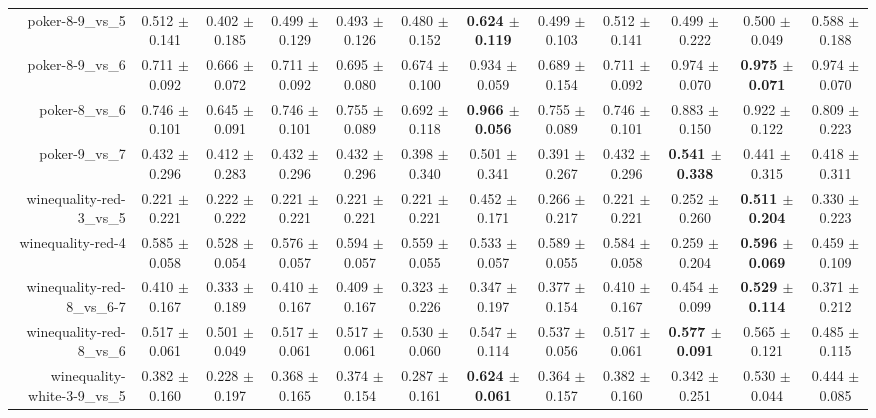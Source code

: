 \begin{table}[!ht]
{\begin{tabular}{r c c c c c c c c c c c}
poker-8-9\_vs\_5 & 0.512 $\pm$ 0.141 & 0.402 $\pm$ 0.185 & 0.499 $\pm$ 0.129 & 0.493 $\pm$ 0.126 & 0.480 $\pm$ 0.152 & \textbf{0.624 $\pm$ 0.119} & 0.499 $\pm$ 0.103 & 0.512 $\pm$ 0.141 & 0.499 $\pm$ 0.222 & 0.500 $\pm$ 0.049 & 0.588 $\pm$ 0.188 \\
poker-8-9\_vs\_6 & 0.711 $\pm$ 0.092 & 0.666 $\pm$ 0.072 & 0.711 $\pm$ 0.092 & 0.695 $\pm$ 0.080 & 0.674 $\pm$ 0.100 & 0.934 $\pm$ 0.059 & 0.689 $\pm$ 0.154 & 0.711 $\pm$ 0.092 & 0.974 $\pm$ 0.070 & \textbf{0.975 $\pm$ 0.071} & 0.974 $\pm$ 0.070 \\
poker-8\_vs\_6 & 0.746 $\pm$ 0.101 & 0.645 $\pm$ 0.091 & 0.746 $\pm$ 0.101 & 0.755 $\pm$ 0.089 & 0.692 $\pm$ 0.118 & \textbf{0.966 $\pm$ 0.056} & 0.755 $\pm$ 0.089 & 0.746 $\pm$ 0.101 & 0.883 $\pm$ 0.150 & 0.922 $\pm$ 0.122 & 0.809 $\pm$ 0.223 \\
poker-9\_vs\_7 & 0.432 $\pm$ 0.296 & 0.412 $\pm$ 0.283 & 0.432 $\pm$ 0.296 & 0.432 $\pm$ 0.296 & 0.398 $\pm$ 0.340 & 0.501 $\pm$ 0.341 & 0.391 $\pm$ 0.267 & 0.432 $\pm$ 0.296 & \textbf{0.541 $\pm$ 0.338} & 0.441 $\pm$ 0.315 & 0.418 $\pm$ 0.311 \\
winequality-red-3\_vs\_5 & 0.221 $\pm$ 0.221 & 0.222 $\pm$ 0.222 & 0.221 $\pm$ 0.221 & 0.221 $\pm$ 0.221 & 0.221 $\pm$ 0.221 & 0.452 $\pm$ 0.171 & 0.266 $\pm$ 0.217 & 0.221 $\pm$ 0.221 & 0.252 $\pm$ 0.260 & \textbf{0.511 $\pm$ 0.204} & 0.330 $\pm$ 0.223 \\
winequality-red-4 & 0.585 $\pm$ 0.058 & 0.528 $\pm$ 0.054 & 0.576 $\pm$ 0.057 & 0.594 $\pm$ 0.057 & 0.559 $\pm$ 0.055 & 0.533 $\pm$ 0.057 & 0.589 $\pm$ 0.055 & 0.584 $\pm$ 0.058 & 0.259 $\pm$ 0.204 & \textbf{0.596 $\pm$ 0.069} & 0.459 $\pm$ 0.109 \\
winequality-red-8\_vs\_6-7 & 0.410 $\pm$ 0.167 & 0.333 $\pm$ 0.189 & 0.410 $\pm$ 0.167 & 0.409 $\pm$ 0.167 & 0.323 $\pm$ 0.226 & 0.347 $\pm$ 0.197 & 0.377 $\pm$ 0.154 & 0.410 $\pm$ 0.167 & 0.454 $\pm$ 0.099 & \textbf{0.529 $\pm$ 0.114} & 0.371 $\pm$ 0.212 \\
winequality-red-8\_vs\_6 & 0.517 $\pm$ 0.061 & 0.501 $\pm$ 0.049 & 0.517 $\pm$ 0.061 & 0.517 $\pm$ 0.061 & 0.530 $\pm$ 0.060 & 0.547 $\pm$ 0.114 & 0.537 $\pm$ 0.056 & 0.517 $\pm$ 0.061 & \textbf{0.577 $\pm$ 0.091} & 0.565 $\pm$ 0.121 & 0.485 $\pm$ 0.115 \\
winequality-white-3-9\_vs\_5 & 0.382 $\pm$ 0.160 & 0.228 $\pm$ 0.197 & 0.368 $\pm$ 0.165 & 0.374 $\pm$ 0.154 & 0.287 $\pm$ 0.161 & \textbf{0.624 $\pm$ 0.061} & 0.364 $\pm$ 0.157 & 0.382 $\pm$ 0.160 & 0.342 $\pm$ 0.251 & 0.530 $\pm$ 0.044 & 0.444 $\pm$ 0.085 \\

\end{tabular}}
\end{table}
